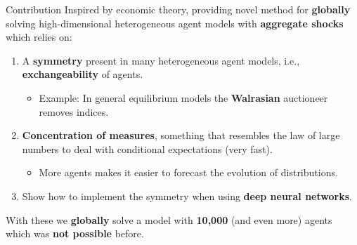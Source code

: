 \documentclass[aspectratio=169,10pt]{beamer}
\newcommand{\emphcolor}[1]{\textbf{\textcolor{emphcolorval}{#1}}}
\begin{document}
\begin{frame}{Contribution}
	Inspired by economic theory, providing novel method for \emphcolor{globally} solving high-dimensional heterogeneous agent models with \emphcolor{aggregate shocks} which relies on:\vspace{0.1in}
	\begin{enumerate}
		\item A \emphcolor{symmetry} present in many heterogeneous agent models, i.e., \emphcolor{exchangeability} of agents.\vspace{0.1in}
		\begin{itemize}
			\item Example: In general equilibrium models the \emphcolor{Walrasian} auctioneer removes indices.\vspace{0.1in}
		\end{itemize}
		\item \emphcolor{Concentration of measures}, something that resembles the law of large numbers to deal with conditional expectations (very fast).\vspace{0.1in}
		\begin{itemize}
			\item More agents makes it easier to forecast the evolution of distributions. \vspace{0.1in}  
		\end{itemize}	 

		\item Show how to implement the symmetry when using \emphcolor{deep neural networks}. \vspace{0.1in} 
		
	\end{enumerate}
With these we \emphcolor{globally} solve a model with \emphcolor{10,000} (and even more) agents which was \emphcolor{not possible} before.
\end{frame}
\end{document}
